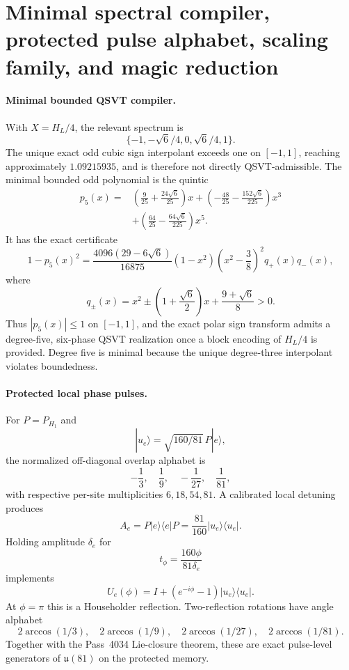 \section{Minimal spectral compiler, protected pulse alphabet, scaling family, and magic reduction}
\label{sec:bt4049-4056}

\paragraph{Minimal bounded QSVT compiler.}
With $X=H_L/4$, the relevant spectrum is
\[
\{-1,-\sqrt6/4,0,\sqrt6/4,1\}.
\]
The unique exact odd cubic sign interpolant exceeds one on $[-1,1]$, reaching
approximately $1.09215935$, and is therefore not directly QSVT-admissible.  The
minimal bounded odd polynomial is the quintic
\[
\begin{aligned}
p_5(x)={}&\left(\frac9{25}+\frac{24\sqrt6}{25}\right)x
+\left(-\frac{48}{25}-\frac{152\sqrt6}{225}\right)x^3\\
&+\left(\frac{64}{25}-\frac{64\sqrt6}{225}\right)x^5.
\end{aligned}
\]
It has the exact certificate
\[
1-p_5(x)^2=
\frac{4096(29-6\sqrt6)}{16875}(1-x^2)
\left(x^2-\frac38\right)^2q_+(x)q_-(x),
\]
where
\[
q_\pm(x)=x^2\pm\left(1+\frac{\sqrt6}{2}\right)x+
\frac{9+\sqrt6}{8}>0.
\]
Thus $|p_5(x)|\le1$ on $[-1,1]$, and the exact polar sign transform admits a
degree-five, six-phase QSVT realization once a block encoding of $H_L/4$ is
provided.  Degree five is minimal because the unique degree-three interpolant
violates boundedness.

\paragraph{Protected local phase pulses.}
For $P=P_{H_1}$ and
\[
|u_e\rangle=\sqrt{160/81}\,P|e\rangle,
\]
the normalized off-diagonal overlap alphabet is
\[
-\frac13,\quad\frac19,\quad-\frac1{27},\quad\frac1{81},
\]
with respective per-site multiplicities $6,18,54,81$.  A calibrated local
detuning produces
\[
A_e=P|e\rangle\!\langle e|P=\frac{81}{160}|u_e\rangle\!\langle u_e|.
\]
Holding amplitude $\delta_e$ for
\[
t_\phi=\frac{160\phi}{81\delta_e}
\]
implements
\[
U_e(\phi)=I+(e^{-i\phi}-1)|u_e\rangle\!\langle u_e|.
\]
At $\phi=\pi$ this is a Householder reflection.  Two-reflection rotations have
angle alphabet
\[
2\arccos(1/3),\quad2\arccos(1/9),\quad
2\arccos(1/27),\quad2\arccos(1/81).
\]
Together with the Pass~4034 Lie-closure theorem, these are exact pulse-level
generators of $\mathfrak u(81)$ on the protected memory.

